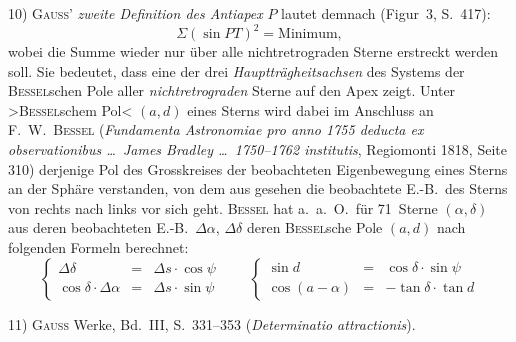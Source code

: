 \documentclass[12pt,a4paper]{article}
\theoremstyle{plain}
\theoremstyle{definition}
\theoremstyle{remark}
\begin{document}
\begin{small}
10) \textsc{Gauss'} \textit{zweite Definition des Antiapex} $P$ lautet demnach (Figur~3, S.~417):
\begin{equation}\tag{2}
\Sigma(\sin PT)^{2} = \text{Minimum},
\end{equation}
wobei die Summe wieder nur \"uber alle nichtretrograden Sterne erstreckt werden
soll. Sie bedeutet, dass eine der drei \textit{Haupttr\"agheitsachsen} des Systems der
\textsc{Bessel}schen Pole aller \textit{nichtretrograden} Sterne auf den Apex zeigt. Unter
\textgreater{}\textsc{Bessel}schem Pol\textless{} $(a, d)$ eines Sterns wird dabei im Anschluss an
F.~W.~\textsc{Bessel} (\textit{Fundamenta Astronomiae pro anno 1755 deducta ex
observationibus \dots\ James Bradley \dots\ 1750--1762 institutis}, Regiomonti 1818,
Seite 310) derjenige Pol des Grosskreises der beobachteten Eigenbewegung eines
Sterns an der Sph\"are verstanden, von dem aus gesehen die beobachtete E.-B.~des
Sterns von rechts nach links vor sich geht. \textsc{Bessel} hat a.~a.~O.~f\"ur 71~Sterne
$(\alpha, \delta)$ aus deren beobachteten E.-B.~$\Delta\alpha$, $\Delta\delta$ deren
\textsc{Bessel}sche Pole $(a, d)$ nach folgenden Formeln berechnet:
\begin{equation}\tag{3}
\left\{\begin{array}{rcl}
\Delta\delta & = & \Delta s\cdot\cos\psi\\
\cos\delta\cdot\Delta\alpha & = & \Delta s\cdot\sin\psi
\end{array}\right.\qquad
\left\{\begin{array}{rcl}
\sin d & = & \cos\delta\cdot\sin\psi\\
\cos(a - \alpha) & = & -\tan\delta\cdot\tan d
\end{array}\right.
\end{equation}

11) \textsc{Gauss} Werke, Bd.~III, S.~331--353 (\textit{Determinatio attractionis}).


\end{small}
\end{document}
